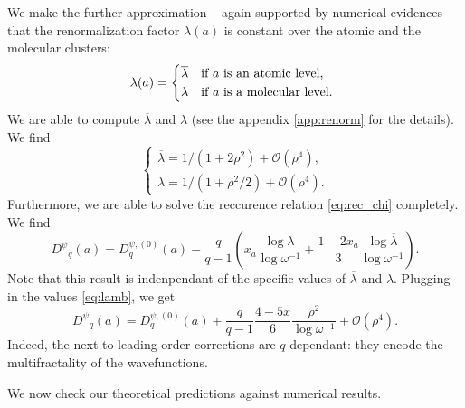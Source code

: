 \documentclass[aps,prl,preprint]{revtex4-1}
\newcommand{\lb}{\ensuremath{\overline{\lambda}}}
\newcommand{\wf}{\ensuremath{D^\psi}}
\begin{document}
We make the further approximation -- again supported by numerical evidences -- that the renormalization factor $\lambda(a)$ is constant over the atomic and the molecular clusters:
\begin{equation}
	\lambda(a) = \begin{cases*}
	\lb & if $a$ is an atomic level, \\
	\lambda & if $a$ is a molecular level. \\
	\end{cases*}
\end{equation}
We are able to compute $\lb$ and $\lambda$ (see the appendix \eqref{app:renorm} for the details). We find
\begin{equation}
\label{eq:lamb}
	\begin{cases}
		\lb = 1/(1+2\rho^2) + \mathcal{O}(\rho^4), \\
		\lambda = 1/(1+\rho^2/2) + \mathcal{O}(\rho^4).
	\end{cases}
\end{equation}
Furthermore, we are able to solve the reccurence relation \eqref{eq:rec_chi} completely. We find
\begin{equation}
	\wf_q(a) = D_q^{\psi,(0)}(a) - \frac{q}{q-1} \left( x_a \frac{\log \lambda}{\log \omega^{-1}} + \frac{1-2x_a}{3}\frac{\log \lb}{\log \omega^{-1}} \right).
\end{equation}
Note that this result is indenpendant of the specific values of $\lb$ and $\lambda$.
Plugging in the values \eqref{eq:lamb}, we get
\begin{equation}
\label{eq:dqpsi2}
	\wf_q(a) =  D_q^{\psi,(0)}(a) + \frac{q}{q-1} \frac{4-5x}{6} \frac{\rho^2}{\log \omega^{-1}} + \mathcal{O}(\rho^4).
\end{equation}
Indeed, the next-to-leading order corrections are $q$-dependant: they encode the multifractality of the wavefunctions.

We now check our theoretical predictions against numerical results.
\end{document}

